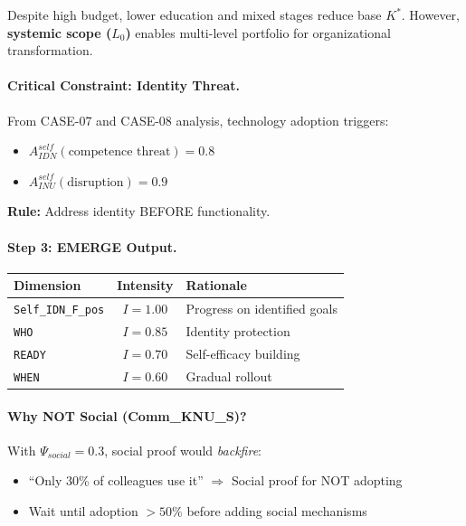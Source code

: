 Despite high budget, lower education and mixed stages reduce base $K^*$. However, \textbf{systemic scope ($L_0$)} enables multi-level portfolio for organizational transformation.

\paragraph{Critical Constraint: Identity Threat.}

From CASE-07 and CASE-08 analysis, technology adoption triggers:
\begin{itemize}[nosep]
    \item $A^{self}_{IDN}(\text{competence threat}) = 0.8$
    \item $A^{self}_{INU}(\text{disruption}) = 0.9$
\end{itemize}

\textbf{Rule:} Address identity BEFORE functionality.

\paragraph{Step 3: EMERGE Output.}

\begin{center}
\begin{tabular}{@{}lcl@{}}
\toprule
\textbf{Dimension} & \textbf{Intensity} & \textbf{Rationale} \\
\midrule
\texttt{Self\_IDN\_F\_pos} & $I = 1.00$ & Progress on identified goals \\
\texttt{WHO} & $I = 0.85$ & Identity protection \\
\texttt{READY} & $I = 0.70$ & Self-efficacy building \\
\texttt{WHEN} & $I = 0.60$ & Gradual rollout \\
\bottomrule
\end{tabular}
\end{center}

\paragraph{Why NOT Social (Comm\_KNU\_S)?}

With $\Psi_{social} = 0.3$, social proof would \emph{backfire}:
\begin{itemize}[nosep]
    \item ``Only 30\% of colleagues use it'' $\Rightarrow$ Social proof for NOT adopting
    \item Wait until adoption $> 50\%$ before adding social mechanisms
\end{itemize}

